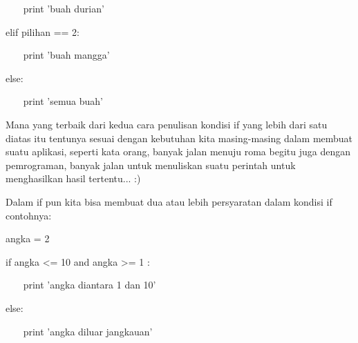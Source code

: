  
~~~ print 'buah durian' 

 
elif pilihan == 2: 

 
~~~ print 'buah mangga' 

 
else: 

 
~~~ print 'semua buah' 

 
Mana yang terbaik dari kedua cara penulisan kondisi if yang lebih dari satu diatas itu tentunya sesuai dengan kebutuhan kita masing-masing dalam membuat suatu aplikasi, seperti kata orang, banyak jalan menuju roma begitu juga dengan pemrograman, banyak jalan untuk menuliskan suatu perintah untuk menghasilkan hasil tertentu... :) 

 
Dalam if pun kita bisa membuat dua atau lebih persyaratan dalam kondisi   if   contohnya: 

 
angka = 2 

 
if angka <= 10 and angka >= 1 : 

 
~~~ print 'angka diantara 1 dan 10' 

 
else: 

 
~~~ print 'angka diluar jangkauan' 




